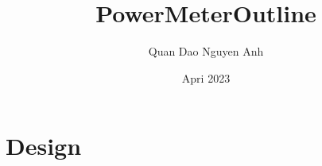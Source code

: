 \documentclass[12pt,letterpaper]{report}
\title{PowerMeterOutline}
\author{Quan Dao Nguyen Anh}
\date{Apri 2023}
\begin{document}
\maketitle

\chapter{Design}

\pagebreak

\pagebreak

\printbibliography
\end{document}
